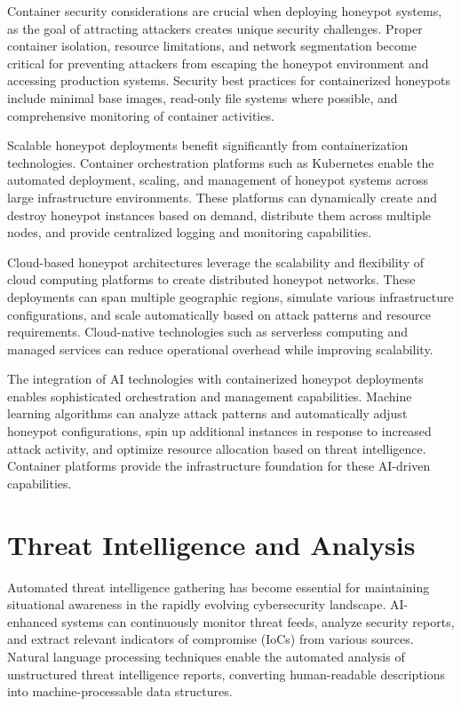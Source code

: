Container security considerations are crucial when deploying honeypot systems, as the goal of attracting attackers creates unique security challenges. Proper container isolation, resource limitations, and network segmentation become critical for preventing attackers from escaping the honeypot environment and accessing production systems. Security best practices for containerized honeypots include minimal base images, read-only file systems where possible, and comprehensive monitoring of container activities.

Scalable honeypot deployments benefit significantly from containerization technologies. Container orchestration platforms such as Kubernetes enable the automated deployment, scaling, and management of honeypot systems across large infrastructure environments. These platforms can dynamically create and destroy honeypot instances based on demand, distribute them across multiple nodes, and provide centralized logging and monitoring capabilities.

Cloud-based honeypot architectures leverage the scalability and flexibility of cloud computing platforms to create distributed honeypot networks. These deployments can span multiple geographic regions, simulate various infrastructure configurations, and scale automatically based on attack patterns and resource requirements. Cloud-native technologies such as serverless computing and managed services can reduce operational overhead while improving scalability.

The integration of AI technologies with containerized honeypot deployments enables sophisticated orchestration and management capabilities. Machine learning algorithms can analyze attack patterns and automatically adjust honeypot configurations, spin up additional instances in response to increased attack activity, and optimize resource allocation based on threat intelligence. Container platforms provide the infrastructure foundation for these AI-driven capabilities.

\section{Threat Intelligence and Analysis}

Automated threat intelligence gathering has become essential for maintaining situational awareness in the rapidly evolving cybersecurity landscape. AI-enhanced systems can continuously monitor threat feeds, analyze security reports, and extract relevant indicators of compromise (IoCs) from various sources. Natural language processing techniques enable the automated analysis of unstructured threat intelligence reports, converting human-readable descriptions into machine-processable data structures.

